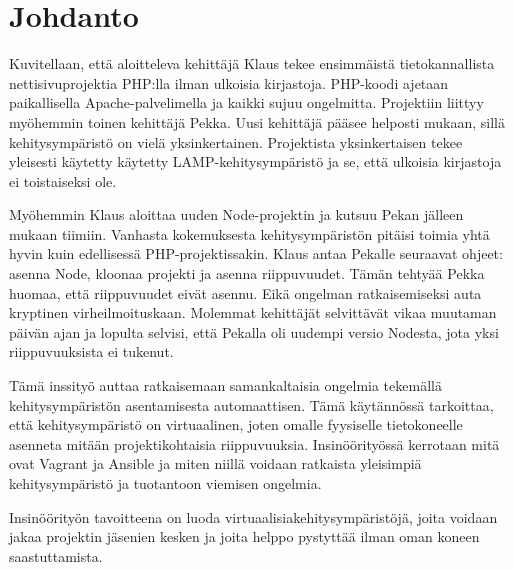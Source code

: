 \chapter{Johdanto}

Kuvitellaan, että aloitteleva kehittäjä Klaus tekee ensimmäistä tietokannallista nettisivuprojektia PHP:lla ilman ulkoisia kirjastoja. PHP-koodi ajetaan paikallisella Apache-palvelimella ja kaikki sujuu ongelmitta. Projektiin liittyy myöhemmin toinen kehittäjä Pekka. Uusi kehittäjä pääsee helposti mukaan, sillä kehitysympäristö on vielä yksinkertainen. Projektista yksinkertaisen tekee yleisesti käytetty käytetty LAMP-kehitysympäristö ja se, että ulkoisia kirjastoja ei toistaiseksi ole.

Myöhemmin Klaus aloittaa uuden Node-projektin ja kutsuu Pekan jälleen mukaan tiimiin. Vanhasta kokemuksesta kehitysympäristön pitäisi toimia yhtä hyvin kuin edellisessä PHP-projektissakin. Klaus antaa Pekalle seuraavat ohjeet: asenna Node, kloonaa projekti ja asenna riippuvuudet. Tämän tehtyää Pekka huomaa, että riippuvuudet eivät asennu. Eikä ongelman ratkaisemiseksi auta kryptinen virheilmoituskaan. Molemmat kehittäjät selvittävät vikaa muutaman päivän ajan ja lopulta selvisi, että Pekalla oli uudempi versio Nodesta, jota yksi riippuvuuksista ei tukenut.

Tämä inssityö auttaa ratkaisemaan samankaltaisia ongelmia tekemällä  kehitysympäristön asentamisesta automaattisen. Tämä käytännössä tarkoittaa, että kehitysympäristö on virtuaalinen, joten omalle fyysiselle tietokoneelle asenneta mitään projektikohtaisia riippuvuuksia. Insinöörityössä kerrotaan mitä ovat Vagrant ja Ansible ja miten niillä voidaan ratkaista yleisimpiä kehitysympäristö ja tuotantoon viemisen ongelmia.

Insinöörityön tavoitteena on luoda virtuaalisiakehitysympäristöjä, joita voidaan jakaa projektin jäsenien kesken ja joita helppo pystyttää ilman oman koneen saastuttamista.
